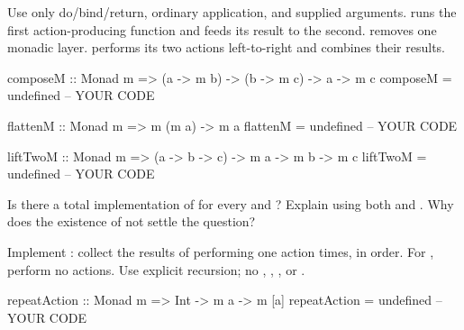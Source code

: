 \clearpage
{}
Use only do/bind/return, ordinary application, and supplied arguments.
 runs the first action-producing function and feeds its result
to the second.  removes one monadic layer. 
performs its two actions left-to-right and combines their results.
\par\noindent\begin{minipage}{\linewidth}
\begin{codeanswer}
composeM :: Monad m => (a -> m b) -> (b -> m c) -> a -> m c
composeM = undefined  -- YOUR CODE

flattenM :: Monad m => m (m a) -> m a
flattenM = undefined  -- YOUR CODE

liftTwoM :: Monad m => (a -> b -> c) -> m a -> m b -> m c
liftTwoM = undefined  -- YOUR CODE
\end{codeanswer}
\end{minipage}\par

Is there a total implementation of  for
every  and ? Explain using both  and
. Why does the existence of  not settle the question?

Implement : collect the results of performing one action
 times, in order. For , perform no actions. Use explicit
recursion; no , , , or .
\par\noindent\begin{minipage}{\linewidth}
\begin{codeanswer}
repeatAction :: Monad m => Int -> m a -> m [a]
repeatAction = undefined  -- YOUR CODE
\end{codeanswer}
\end{minipage}\par
{}
